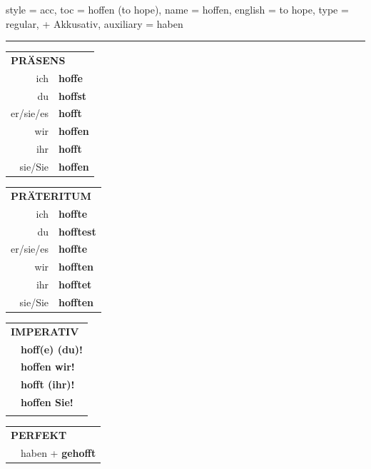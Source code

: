 \begin{verbentry}{
  style = {acc},
  toc = {hoffen (to hope)},
  name = {hoffen},
  english = {to hope},
  type = {regular, + Akkusativ},
  auxiliary = {haben}
}
 
    
     \vspace{5pt}

    \hrule
    
    \vspace{5pt}

  \begin{tabular}{rl}
     \multicolumn{2}{l}{\textbf{PRÄSENS} }\\
    ich & \textbf{hoffe}\\
    du & \textbf{hoffst}\\
    er/sie/es & \textbf{hofft}\\
    wir & \textbf{hoffen}\\
    ihr & \textbf{hofft}\\
    sie/Sie & \textbf{hoffen}\\
  \end{tabular}
  \hfill
     \begin{tabular}{rl}
    \multicolumn{2}{l}{\textbf{PRÄTERITUM} }\\
    ich & \textbf{hoffte}\\
    du & \textbf{hofftest}\\
    er/sie/es & \textbf{hoffte}\\
    wir & \textbf{hofften}\\
    ihr & \textbf{hofftet}\\
    sie/Sie & \textbf{hofften}\\
  \end{tabular}
  \hfill
  \begin{tabular}{rl}
     \multicolumn{2}{l}{\textbf{IMPERATIV} }\\
   & \textbf{hoff(e) (du)!}\\
   & \textbf{hoffen wir!}\\
   & \textbf{hofft (ihr)!}\\
   & \textbf{hoffen Sie!}\\
   & \vspace{10pt}
  \end{tabular}

    \vspace{10pt}

 \begin{tabular}{rl}
     \multicolumn{2}{l}{\textbf{PERFEKT}}\\
   & haben + \textbf{gehofft}\\
  \end{tabular}
\hfill
   \begin{tabular}{rl}
   

\end{tabular}
\end{verbentry}
